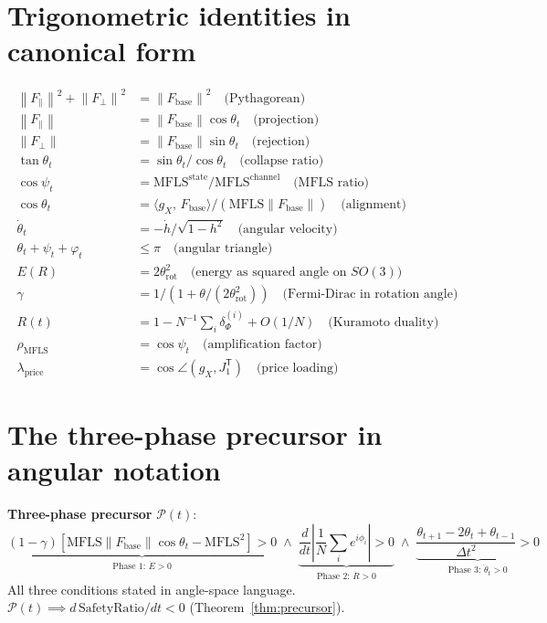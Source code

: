 \documentclass[11pt,a4paper,openany]{book}
\theoremstyle{definition}
\newcommand{\T}{^{\mathsf{T}}}
\newcommand{\norm}[1]{\left\|#1\right\|}
\newcommand{\inner}[2]{\langle #1,\,#2\rangle}
\newcommand{\Fbase}{F_{\mathrm{base}}}
\newcommand{\gX}{g_X}
\newcommand{\mfls}{\mathrm{MFLS}}
\begin{document}
\section{Trigonometric identities in canonical form}

\begin{resultbox}
\begin{align*}
\norm{F_\parallel}^2 + \norm{F_\perp}^2 &= \norm{\Fbase}^2 \quad\text{(Pythagorean)} \\
\norm{F_\parallel} &= \norm{\Fbase}\cos\theta_t \quad\text{(projection)} \\
\norm{F_\perp} &= \norm{\Fbase}\sin\theta_t \quad\text{(rejection)} \\
\tan\theta_t &= \sin\theta_t/\cos\theta_t \quad\text{(collapse ratio)} \\
\cos\psi_t &= \mfls^\mathrm{state}/\mfls^\mathrm{channel} \quad\text{(MFLS ratio)} \\
\cos\theta_t &= \inner{\gX}{\Fbase}/(\mfls\norm{\Fbase}) \quad\text{(alignment)} \\
\dot\theta_t &= -\dot h/\sqrt{1-h^2} \quad\text{(angular velocity)} \\
\theta_t + \psi_t + \varphi_t &\leq \pi \quad\text{(angular triangle)} \\
E(R) &= 2\theta_\mathrm{rot}^2 \quad\text{(energy as squared angle on }SO(3)\text{)} \\
\gamma &= 1/(1+\theta/(2\theta_\mathrm{rot}^2)) \quad\text{(Fermi-Dirac in rotation angle)} \\
R(t) &= 1 - N^{-1}\textstyle\sum_i\delta_\Phi^{(i)} + O(1/N) \quad\text{(Kuramoto duality)} \\
\rho_\mfls &= \cos\psi_t \quad\text{(amplification factor)} \\
\lambda_\mathrm{price} &= \cos\angle(\gX, J_1\T) \quad\text{(price loading)}
\end{align*}
\end{resultbox}

\section{The three-phase precursor in angular notation}

\begin{lockedbox}
\textbf{Three-phase precursor} $\mathcal{P}(t)$:
\[
\underbrace{(1-\gamma)\left[\mfls\norm{\Fbase}\cos\theta_t - \mfls^2\right] > 0}_{\text{Phase 1: } \dot E > 0}
\;\wedge\;
\underbrace{\frac{d}{dt}\left|\frac{1}{N}\sum_i e^{i\phi_i}\right| > 0}_{\text{Phase 2: } \dot R > 0}
\;\wedge\;
\underbrace{\frac{\theta_{t+1}-2\theta_t+\theta_{t-1}}{\Delta t^2} > 0}_{\text{Phase 3: }\ddot\theta_t > 0}
\]
All three conditions stated in angle-space language.
$\mathcal{P}(t) \implies d\,\mathrm{SafetyRatio}/dt < 0$ (Theorem~\ref{thm:precursor}).
\end{lockedbox}
\end{document}
